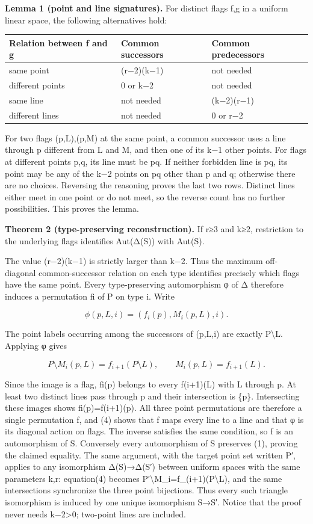 \documentclass[
  11pt,
  a4paper,
]{article}
\newcounter{none} %
\begin{document}
\textbf{Lemma 1 (point and line signatures).} For distinct flags f,g in
a uniform linear space, the following alternatives hold:

{\def\LTcaptype{none} %
\begin{longtable}[]{@{}lll@{}}
\toprule\noalign{}
Relation between f and g & Common successors & Common predecessors \\
\midrule\noalign{}
\endhead
\bottomrule\noalign{}
\endlastfoot
same point & (r−2)(k−1) & not needed \\
different points & 0 or k−2 & not needed \\
same line & not needed & (k−2)(r−1) \\
different lines & not needed & 0 or r−2 \\
\end{longtable}
}

For two flags (p,L),(p,M) at the same point, a common successor uses a
line through p different from L and M, and then one of its k−1 other
points. For flags at different points p,q, its line must be pq. If
neither forbidden line is pq, its point may be any of the k−2 points on
pq other than p and q; otherwise there are no choices. Reversing the
reasoning proves the last two rows. Distinct lines either meet in one
point or do not meet, so the reverse count has no further possibilities.
This proves the lemma.

\textbf{Theorem 2 (type-preserving reconstruction).} If r≥3 and k≥2,
restriction to the underlying flags identifies Aut(Δ(S)) with Aut(S).

The value (r−2)(k−1) is strictly larger than k−2. Thus the maximum
off-diagonal common-successor relation on each type identifies precisely
which flags have the same point. Every type-preserving automorphism φ of
Δ therefore induces a permutation fi of P on type i. Write

\[
 \phi(p,L,i)=(f_i(p),M_i(p,L),i).
\]

The point labels occurring among the successors of (p,L,i) are exactly
P\textbackslash L. Applying φ gives

\[
 P\setminus M_i(p,L)=f_{i+1}(P\setminus L),
 \qquad M_i(p,L)=f_{i+1}(L).
\tag{4}
\]

Since the image is a flag, fi(p) belongs to every f(i+1)(L) with L
through p. At least two distinct lines pass through p and their
intersection is \{p\}. Intersecting these images shows fi(p)=f(i+1)(p).
All three point permutations are therefore a single permutation f, and
(4) shows that f maps every line to a line and that φ is its diagonal
action on flags. The inverse satisfies the same condition, so f is an
automorphism of S. Conversely every automorphism of S preserves (1),
proving the claimed equality. The same argument, with the target point
set written P′, applies to any isomorphism Δ(S)→Δ(S′) between uniform
spaces with the same parameters k,r: equation(4) becomes
P′\textbackslash M\_i=f\_(i+1)(P\textbackslash L), and the same
intersections synchronize the three point bijections. Thus every such
triangle isomorphism is induced by one unique isomorphism S→S′. Notice
that the proof never needs k−2\textgreater0; two-point lines are
included.
\end{document}
